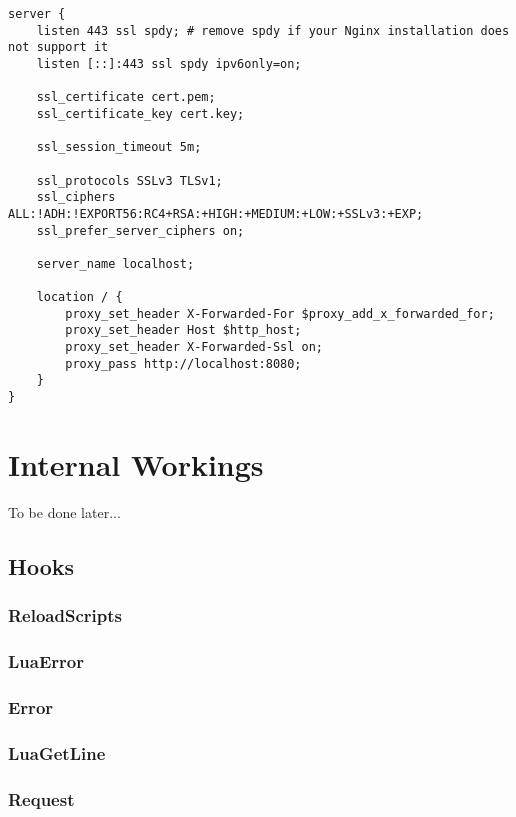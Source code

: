\documentclass[a4paper,11pt]{report}
\newcommand{\setnginx}{\lstset{language=sh}}
\begin{document}
\setnginx
\begin{lstlisting}
server {
	listen 443 ssl spdy; # remove spdy if your Nginx installation does not support it
	listen [::]:443 ssl spdy ipv6only=on;

	ssl_certificate cert.pem;
	ssl_certificate_key cert.key;

	ssl_session_timeout 5m;

	ssl_protocols SSLv3 TLSv1;
	ssl_ciphers ALL:!ADH:!EXPORT56:RC4+RSA:+HIGH:+MEDIUM:+LOW:+SSLv3:+EXP;
	ssl_prefer_server_ciphers on;

	server_name localhost;

	location / {
		proxy_set_header X-Forwarded-For $proxy_add_x_forwarded_for;
		proxy_set_header Host $http_host;
		proxy_set_header X-Forwarded-Ssl on;
		proxy_pass http://localhost:8080;
	}
}
\end{lstlisting}

\chapter{Internal Workings}
To be done later...

\section{Hooks}
\subsection{ReloadScripts}
\subsection{LuaError}
\subsection{Error}
\subsection{LuaGetLine}
\subsection{Request}
\end{document}
